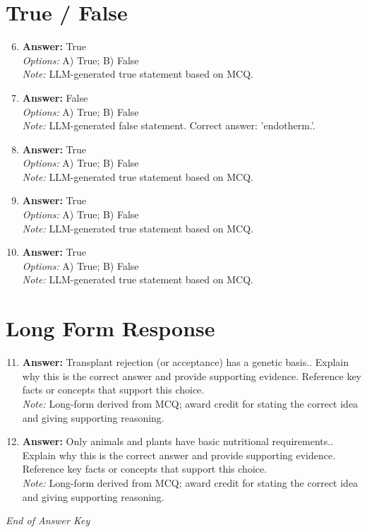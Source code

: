 \documentclass[12pt]{article}
\begin{document}
\section*{True / False}
\begin{enumerate}[label=\arabic*.]
\setcounter{enumi}{5}
\item \textbf{Answer:} True
\\ \textit{Options:} A) True; B) False
\\ \textit{Note:} LLM-generated true statement based on MCQ.
\item \textbf{Answer:} False
\\ \textit{Options:} A) True; B) False
\\ \textit{Note:} LLM-generated false statement. Correct answer: 'endotherm.'.
\item \textbf{Answer:} True
\\ \textit{Options:} A) True; B) False
\\ \textit{Note:} LLM-generated true statement based on MCQ.
\item \textbf{Answer:} True
\\ \textit{Options:} A) True; B) False
\\ \textit{Note:} LLM-generated true statement based on MCQ.
\item \textbf{Answer:} True
\\ \textit{Options:} A) True; B) False
\\ \textit{Note:} LLM-generated true statement based on MCQ.
\end{enumerate}

\section*{Long Form Response}
\begin{enumerate}[label=\arabic*.]
\setcounter{enumi}{10}
\item \textbf{Answer:} Transplant rejection (or acceptance) has a genetic basis.. Explain why this is the correct answer and provide supporting evidence. Reference key facts or concepts that support this choice.
\\ \textit{Note:} Long-form derived from MCQ; award credit for stating the correct idea and giving supporting reasoning.
\item \textbf{Answer:} Only animals and plants have basic nutritional requirements.. Explain why this is the correct answer and provide supporting evidence. Reference key facts or concepts that support this choice.
\\ \textit{Note:} Long-form derived from MCQ; award credit for stating the correct idea and giving supporting reasoning.
\end{enumerate}

\vfill
\noindent\textit{End of Answer Key}
\end{document}

